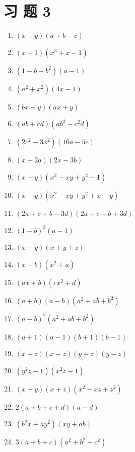 \documentclass[10pt]{article}
\begin{document}
\section*{习 题 3}
\begin{enumerate}
  \item $(x-y)(a+b-c)$
  \item $(x+1)\left(x^{3}+x-1\right)$
  \item $\left(1-b+b^{2}\right)(a-1)$
  \item $\left(a^{2}+x^{2}\right)(4 x-1)$
  \item $(b x-y)(a x+y)$
  \item $(a b+c d)\left(a b^{2}-c^{2} d\right)$
  \item $\left(2 c^{2}-3 x^{2}\right)(16 a-5 c)$
  \item $(x+2 a)(2 x-3 b)$
  \item $(x+y)\left(x^{2}-x y+y^{2}-1\right)$
  \item $(x+y)\left(x^{2}-x y+y^{2}+x+y\right)$
  \item $(2 a+c+b-3 d)(2 a+c-b+3 d)$
  \item $(1-b)^{2}(a-1)$
  \item $(x-y)(x+y+z)$
  \item $(x+b)\left(x^{2}+a\right)$
  \item $(a x+b)\left(c x^{2}+d\right)$
  \item $(a+b)(a-b)\left(a^{2}+a b+b^{2}\right)$
  \item $(a-b)^{2}\left(a^{2}+a b+b^{2}\right)$
  \item $(a+1)(a-1)(b+1)(b-1)$
  \item $(x+z)(x-z)(y+z)(y-z)$
  \item $\left(y^{2} z-1\right)\left(x^{2} z-1\right)$
  \item $(x+y)(x+z)\left(x^{2}-x z+z^{2}\right)$
  \item $2(a+b+c+d)(a-d)$
  \item $\left(b^{2} x+a y^{2}\right)(x y+a b)$
  \item $3(a+b+c)\left(a^{2}+b^{2}+c^{2}\right)$
\end{enumerate}
\end{document}

